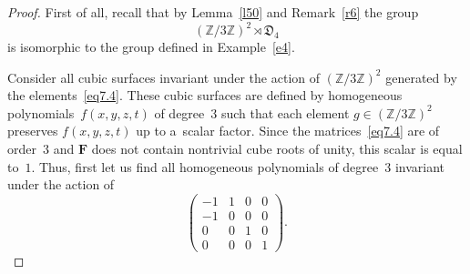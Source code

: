 \documentclass{amsart}
\numberwithin{equation}{section}
\theoremstyle{plain}
\theoremstyle{definition}
\theoremstyle{remark}
\begin{document}
\begin{proof}
First of all, recall that by Lemma~\ref{l50} and Remark~\ref{r6} the group
$$
(\mathbb{Z}/3\mathbb{Z})^2 \rtimes \mathfrak{D}_4
$$
is isomorphic to the group defined in Example~\ref{e4}.

Consider all cubic surfaces invariant under the action of $(\mathbb{Z}/3\mathbb{Z})^2$ generated by the elements~\eqref{eq7.4}. These cubic surfaces are defined by homogeneous polynomials~$f(x,y,z,t)$ of degree~$3$ such that each element $g \in (\mathbb{Z}/3\mathbb{Z})^2$ preserves $f(x,y,z,t)$ up to a~scalar factor. Since the matrices~\eqref{eq7.4} are of order~$3$ and $\mathbf{F}$ does not contain nontrivial cube roots of unity, this scalar is equal to~$1$. Thus, first let us find all homogeneous polynomials of degree~$3$ invariant under the action of
\begin{equation}
\label{eq7.7}
\begin{pmatrix}
-1 & 1 & 0 & 0\\
-1 & 0 & 0 & 0\\
0 & 0 & 1 & 0\\
0 & 0 & 0 & 1
\end{pmatrix}.
\end{equation}


\end{proof}
\end{document}
